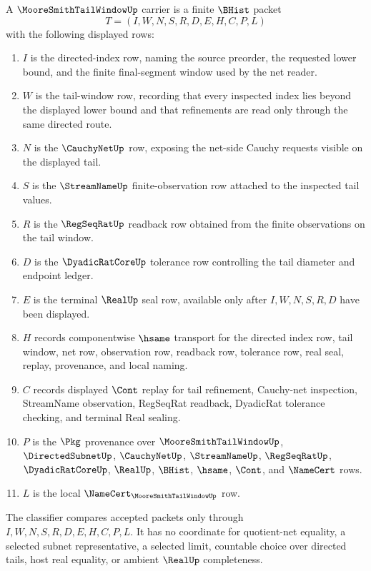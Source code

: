 \begin{definition}
\label{def:moore-smith-tail-window-carrier}
A $\MooreSmithTailWindowUp$ carrier is a finite $\BHist$ packet
$$
T=(I,W,N,S,R,D,E,H,C,P,L)
$$
with the following displayed rows:
\begin{enumerate}
\item $I$ is the directed-index row, naming the source preorder, the requested lower bound, and the finite final-segment window used by the net reader.
\item $W$ is the tail-window row, recording that every inspected index lies beyond the displayed lower bound and that refinements are read only through the same directed route.
\item $N$ is the $\CauchyNetUp$ row, exposing the net-side Cauchy requests visible on the displayed tail.
\item $S$ is the $\StreamNameUp$ finite-observation row attached to the inspected tail values.
\item $R$ is the $\RegSeqRatUp$ readback row obtained from the finite observations on the tail window.
\item $D$ is the $\DyadicRatCoreUp$ tolerance row controlling the tail diameter and endpoint ledger.
\item $E$ is the terminal $\RealUp$ seal row, available only after $I,W,N,S,R,D$ have been displayed.
\item $H$ records componentwise $\hsame$ transport for the directed index row, tail window, net row, observation row, readback row, tolerance row, real seal, replay, provenance, and local naming.
\item $C$ records displayed $\Cont$ replay for tail refinement, Cauchy-net inspection, StreamName observation, RegSeqRat readback, DyadicRat tolerance checking, and terminal Real sealing.
\item $P$ is the $\Pkg$ provenance over $\MooreSmithTailWindowUp$, $\DirectedSubnetUp$, $\CauchyNetUp$, $\StreamNameUp$, $\RegSeqRatUp$, $\DyadicRatCoreUp$, $\RealUp$, $\BHist$, $\hsame$, $\Cont$, and $\NameCert$ rows.
\item $L$ is the local $\NameCert_{\MooreSmithTailWindowUp}$ row.
\end{enumerate}
The classifier compares accepted packets only through $I,W,N,S,R,D,E,H,C,P,L$. It has no coordinate for quotient-net equality, a selected subnet representative, a selected limit, countable choice over directed tails, host real equality, or ambient $\RealUp$ completeness.
\end{definition}

